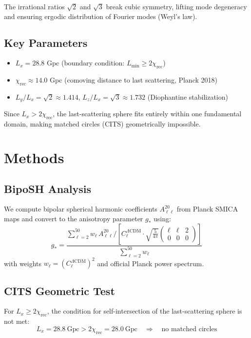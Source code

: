 \documentclass[a4paper,11pt]{article}
\begin{document}
The irrational ratios $\sqrt{2}$ and $\sqrt{3}$ break cubic symmetry, lifting mode degeneracy and ensuring ergodic distribution of Fourier modes (Weyl's law).

\subsection{Key Parameters}

\begin{itemize}
\item $L_x = 28.8$ Gpc (boundary condition: $L_{\min} \geq 2\chi_{\text{rec}}$)
\item $\chi_{\text{rec}} \approx 14.0$ Gpc (comoving distance to last scattering, Planck 2018)
\item $L_y/L_x = \sqrt{2} \approx 1.414$, $L_z/L_x = \sqrt{3} \approx 1.732$ (Diophantine stabilization)
\end{itemize}

Since $L_x > 2\chi_{\text{rec}}$, the last-scattering sphere fits entirely within one fundamental domain, making matched circles (CITS) geometrically impossible.

\section{Methods}

\subsection{BipoSH Analysis}

We compute bipolar spherical harmonic coefficients $A_{\ell\ell}^{20}$ from Planck SMICA maps and convert to the anisotropy parameter $g_*$ using:
\begin{equation}
g_* = \frac{\sum_{\ell=2}^{50} w_\ell \, A_{\ell\ell}^{20} / \left[C_\ell^{\Lambda\text{CDM}} \cdot \sqrt{\frac{5}{4\pi}} \begin{pmatrix} \ell & \ell & 2 \\ 0 & 0 & 0 \end{pmatrix}\right]}{\sum_{\ell=2}^{50} w_\ell}
\end{equation}
with weights $w_\ell = (C_\ell^{\Lambda\text{CDM}})^2$ and official Planck power spectrum.

\subsection{CITS Geometric Test}

For $L_x \geq 2\chi_{\text{rec}}$, the condition for self-intersection of the last-scattering sphere is not met:
\begin{equation}
L_x = 28.8\ \text{Gpc} > 2\chi_{\text{rec}} = 28.0\ \text{Gpc} \quad \Rightarrow \quad \text{no matched circles}
\end{equation}
\end{document}
